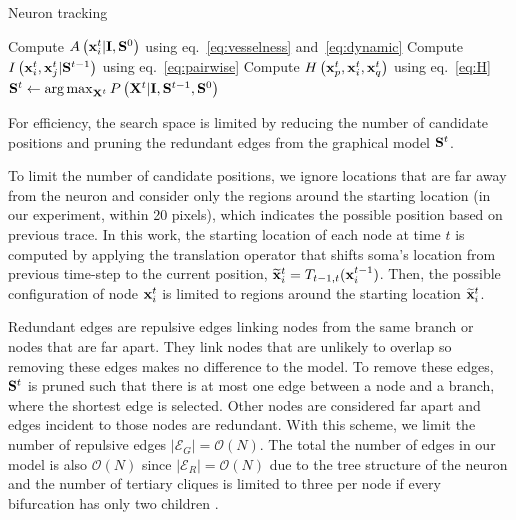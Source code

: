 \documentclass{article}
\DeclareMathOperator*{\argmax}{arg\,max}
\begin{document}
\begin{algorithm}
	\caption{Neuron tracking} \label{alg:track}
	\begin{algorithmic}[1]
		\State Compute $A\left( {\bf x}_i^t | {\bf I}, {\bf S}^0 \right)$ using eq.~\ref{eq:vesselness} and~\ref{eq:dynamic}
		\State Compute $I\left({\bf x}_i^t,{\bf x}_j^t | {\bf S}^{t-1}\right)$ using eq.~\ref{eq:pairwise}
		\State Compute $H\left({\bf x}_p^t,{\bf x}_i^t,{\bf x}_q^t\right)$ using eq.~\ref{eq:H}
		\State ${\bf S}^t \gets \argmax_{{\bf X}^t} P \left( {\bf X}^t | {\bf I}, {\bf S}^{t-1}, {\bf S}^0 \right)$ \label{alg:track:optimize}
		\EndFor
		\State {}
		\EndProcedure
	\end{algorithmic}
\end{algorithm}

For efficiency, the search space is limited by reducing the number of candidate positions and pruning the redundant edges from the graphical model ${\bf S}^t$.

To limit the number of candidate positions, we ignore locations that are far away from the neuron and consider only the regions around the starting location (in our experiment, within 20 pixels), which indicates the possible position based on previous trace. In this work, the starting location of each node at time $t$ is computed by applying the translation operator that shifts soma's location from previous time-step to the current position, $\widetilde{\bf x}^t_i = T_{t-1,t}({\bf x}^{t-1}_i)$. Then, the possible configuration of node ${\bf x}^t_i$ is limited to regions around the starting location $\widetilde{\bf x}^t_i$.

Redundant edges are repulsive edges linking nodes from the same branch or nodes that are far apart. They link nodes that are unlikely to overlap so removing these edges makes no difference to the model. To remove these edges, ${\bf S}^t$ is pruned such that there is at most one edge between a node and a branch, where the shortest edge is selected. Other nodes are considered far apart and edges incident to those nodes are redundant. With this scheme, we limit the number of repulsive edges $| \mathcal{E}_G | = \mathcal{O}(N)$. The total the number of edges in our model is also $\mathcal{O}(N)$ since $| \mathcal{E}_R | = \mathcal{O}(N)$ due to the tree structure of the neuron and the number of tertiary cliques is limited to three per node if every bifurcation has only two children \cite{Farhand2016}.
\end{document}
